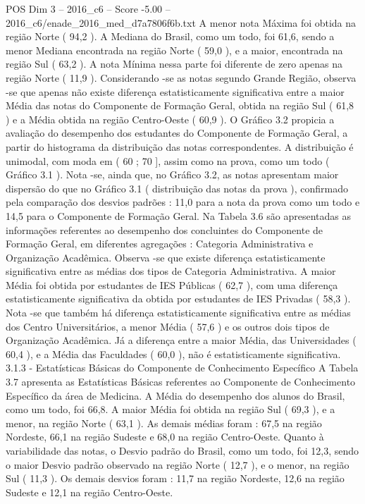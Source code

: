 \begin{textsample}{POS Dim 3 – 2016\_c6 – Score -5.00 – 2016\_c6/enade\_2016\_med\_d7a7806f6b.txt}
A menor nota Máxima foi obtida na região Norte ( 94,2 ).
A Mediana do Brasil, como um todo, foi 61,6, sendo a menor Mediana encontrada na região Norte ( 59,0 ), e a maior, encontrada na região Sul ( 63,2 ).
A nota Mínima nessa parte foi diferente de zero apenas na região Norte ( 11,9 ).
Considerando -se as notas segundo Grande Região, observa -se que apenas não existe diferença estatisticamente significativa entre a maior Média das notas do Componente de Formação Geral, obtida na região Sul ( 61,8 ) e a Média obtida na região Centro-Oeste ( 60,9 ).
O Gráfico 3.2 propicia a avaliação do desempenho dos estudantes do Componente de Formação Geral, a partir do histograma da distribuição das notas correspondentes.
A distribuição é unimodal, com moda em ( 60 ; 70 ], assim como na prova, como um todo ( Gráfico 3.1 ).
Nota -se, ainda que, no Gráfico 3.2, as notas apresentam maior dispersão do que no Gráfico 3.1 ( distribuição das notas da prova ), confirmado pela comparação dos desvios padrões : 11,0 para a nota da prova como um todo e 14,5 para o Componente de Formação Geral.
Na Tabela 3.6 são apresentadas as informações referentes ao desempenho dos concluintes do Componente de Formação Geral, em diferentes agregações : Categoria Administrativa e Organização Acadêmica.
Observa -se que existe diferença estatisticamente significativa entre as médias dos tipos de Categoria Administrativa.
A maior Média foi obtida por estudantes de IES Públicas ( 62,7 ), com uma diferença estatisticamente significativa da obtida por estudantes de IES Privadas ( 58,3 ).
Nota -se que também há diferença estatisticamente significativa entre as médias dos Centro Universitários, a menor Média ( 57,6 ) e os outros dois tipos de Organização Acadêmica.
Já a diferença entre a maior Média, das Universidades ( 60,4 ), e a Média das Faculdades ( 60,0 ), não é estatisticamente significativa. 3.1.3 - Estatísticas Básicas do Componente de Conhecimento Específico A Tabela 3.7 apresenta as Estatísticas Básicas referentes ao Componente de Conhecimento Específico da área de Medicina.
A Média do desempenho dos alunos do Brasil, como um todo, foi 66,8.
A maior Média foi obtida na região Sul ( 69,3 ), e a menor, na região Norte ( 63,1 ).
As demais médias foram : 67,5 na região Nordeste, 66,1 na região Sudeste e 68,0 na região Centro-Oeste.
Quanto à variabilidade das notas, o Desvio padrão do Brasil, como um todo, foi 12,3, sendo o maior Desvio padrão observado na região Norte ( 12,7 ), e o menor, na região Sul ( 11,3 ).
Os demais desvios foram : 11,7 na região Nordeste, 12,6 na região Sudeste e 12,1 na região Centro-Oeste.

\end{textsample}
